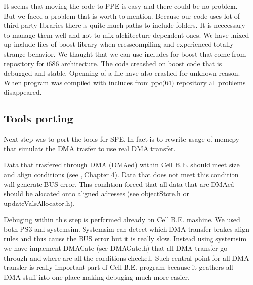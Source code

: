 \par
It seems that moving the code to PPE is easy and there could be no problem.
But we faced a problem that is worth to mention.
Because our code uses lot of third party libraries there is quite much paths to include folders.
It is neccessary to manage them well and not to mix alchitecture dependent ones.
We have mixed up include files of boost library when crosscompiling and experienced totally strange behavior.
We thaught that we can use includes for boost that come from repository for i686 architecture.
The code creashed on boost code that is debugged and stable.
Openning of a file have also crashed for unknown reason.
When program was compiled with includes from ppc(64) repository all problems disappeared.

\subsection{Tools porting}

\par
Next step was to port the tools for SPE.
In fact is to rewrite usage of memcpy that simulate the DMA trasfer to use real DMA transfer.

\par
Data that trasfered through DMA (DMAed) within Cell B.E. should meet size and align conditions (see \cite{programmersGuide}, Chapter 4).
Data that does not meet this condition will generate BUS error.
This condition forced that all data that are DMAed should be alocated onto aligned adresses (see objectStore.h or updateValsAllocator.h).

\par
Debuging within this step is performed already on Cell B.E. mashine.
We used both PS3 and systemsim.
Systemsim can detect which DMA transfer brakes align rules and thus cause the BUS error but it is really slow.
Instead using systemsim we have implement DMAGate (see DMAGate.h) that all DMA transfer go through and where are all the conditions checked.
Such central point for all DMA transfer is really important part of Cell B.E. program because it geathers all DMA stuff into one place making debuging much more easier.
